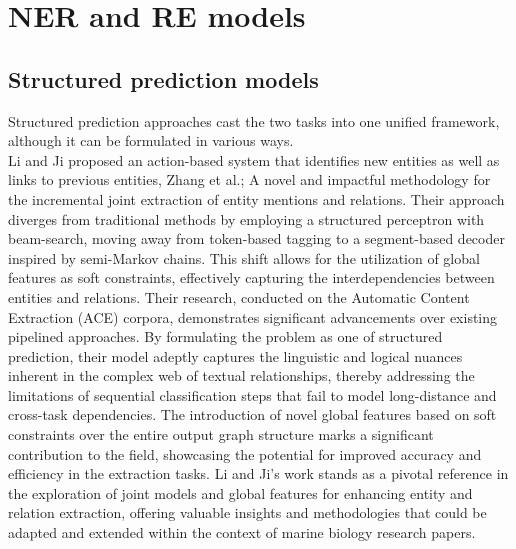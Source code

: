 \section{NER and RE models}

\subsection{Structured prediction models}
Structured prediction approaches cast the two tasks into one unified framework, although it can be formulated in various ways.\\
Li and Ji\cite{li-ji-2014-incremental} proposed an action-based system that identifies new entities as well as links to previous entities, Zhang et al.\cite{zhang-etal-2017-end};
A novel and impactful methodology for the incremental joint extraction of entity mentions and relations. Their approach diverges from traditional methods by employing a structured perceptron with beam-search, moving away from token-based tagging to a segment-based decoder inspired by semi-Markov chains. This shift allows for the utilization of global features as soft constraints, effectively capturing the interdependencies between entities and relations. Their research, conducted on the Automatic Content Extraction (ACE) corpora, demonstrates significant advancements over existing pipelined approaches. By formulating the problem as one of structured prediction, their model adeptly captures the linguistic and logical nuances inherent in the complex web of textual relationships, thereby addressing the limitations of sequential classification steps that fail to model long-distance and cross-task dependencies. The introduction of novel global features based on soft constraints over the entire output graph structure marks a significant contribution to the field, showcasing the potential for improved accuracy and efficiency in the extraction tasks. Li and Ji's work stands as a pivotal reference in the exploration of joint models and global features for enhancing entity and relation extraction, offering valuable insights and methodologies that could be adapted and extended within the context of marine biology research papers.\\

